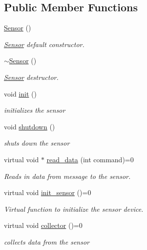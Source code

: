 \subsection*{Public Member Functions}
\begin{DoxyCompactItemize}
\item 
\hyperlink{classSensor_a342d6d11ef572c8cba92cb76fb1a294b}{Sensor} ()
\begin{DoxyCompactList}\small\item\em \hyperlink{classSensor}{Sensor} default constructor. \end{DoxyCompactList}\item 
\hyperlink{classSensor_aee8c70e7ef05ce65e7ee33686b5d7db2}{$\sim$\-Sensor} ()
\begin{DoxyCompactList}\small\item\em \hyperlink{classSensor}{Sensor} destructor. \end{DoxyCompactList}\item 
void \hyperlink{classSensor_a84bc35cfba92eb579bc311b3c8b2980d}{init} ()
\begin{DoxyCompactList}\small\item\em initializes the sensor \end{DoxyCompactList}\item 
void \hyperlink{classSensor_a2f08975182e98e644efb226435124047}{shutdown} ()
\begin{DoxyCompactList}\small\item\em shuts down the sensor \end{DoxyCompactList}\item 
virtual void $\ast$ \hyperlink{classSensor_acf4ff5c6c8f793ed47a8105b94ff7c3e}{read\-\_\-data} (int command)=0
\begin{DoxyCompactList}\small\item\em Reads in data from message to the sensor. \end{DoxyCompactList}\item 
virtual void \hyperlink{classSensor_a11b28f6bc91d6f69e734e13ab0e64f56}{init\-\_\-sensor} ()=0
\begin{DoxyCompactList}\small\item\em Virtual function to initialize the sensor device. \end{DoxyCompactList}\item 
virtual void \hyperlink{classSensor_ae4ec41b880d44feb898da5c62c3203c9}{collector} ()=0
\begin{DoxyCompactList}\small\item\em collects data from the sensor \end{DoxyCompactList}\item 

\end{DoxyCompactItemize}
